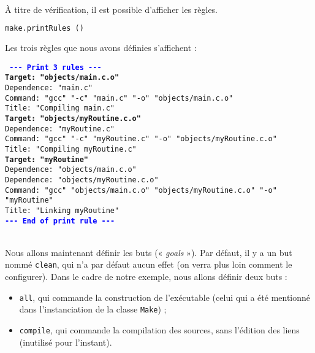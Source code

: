 \documentclass[a4paper,11pt]{extarticle}
\begin{document}
~\\À titre de vérification, il est possible d'afficher les règles.
\begin{lstlisting}[language=py]
make.printRules ()
\end{lstlisting}

Les trois règles que nous avons définies s'affichent :

\begin{mdframed}[hidealllines=true,backgroundcolor=lightgray!20]
\tt\footnotesize
\textcolor{blue}{\bf{-}{-}{-} Print 3 rules {-}{-}{-}}\\
\textcolor{OliveGreen}{\bf Target: "objects/main.c.o"}\\
\hspace*{1.2em}Dependence: "main.c"\\
\hspace*{1.2em}Command:  "gcc" "-c" "main.c" "-o" "objects/main.c.o"\\
\hspace*{1.2em}Title: "Compiling main.c"\\
\textcolor{OliveGreen}{\bf Target: "objects/myRoutine.c.o"}\\
\hspace*{1.2em}Dependence: "myRoutine.c"\\
\hspace*{1.2em}Command:  "gcc" "-c" "myRoutine.c" "-o" "objects/myRoutine.c.o"\\
\hspace*{1.2em}Title: "Compiling myRoutine.c"\\
\textcolor{OliveGreen}{\bf Target: "myRoutine"}\\
\hspace*{1.2em}Dependence: "objects/main.c.o"\\
\hspace*{1.2em}Dependence: "objects/myRoutine.c.o"\\
\hspace*{1.2em}Command:  "gcc" "objects/main.c.o" "objects/myRoutine.c.o" "-o" "myRoutine"\\
\hspace*{1.2em}Title: "Linking myRoutine"\\
\textcolor{blue}{\bf{-}{-}{-} End of print rule {-}{-}{-}}
\end{mdframed}

~\\Nous allons maintenant définir les buts (« \emph{goals} »). Par défaut, il y a un but nommé \texttt{clean}, qui n'a par défaut aucun effet (on verra plus loin comment le configurer). Dans le cadre de notre exemple, nous allons définir deux buts :
\begin{itemize}
  \item \texttt{all}, qui commande la construction de l'exécutable (celui qui a été mentionné dans l'instanciation de la classe \texttt{Make}) ;
  \item \texttt{compile}, qui commande la compilation des sources, sans l'édition des liens (inutilisé pour l'instant).
\end{itemize}
\end{document}
